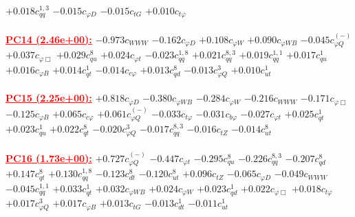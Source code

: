 \documentclass{article}
\begin{document}
{$+0.018$}{\rm $c_{qq}^{1,3}$} 
{$-0.015$}{\rm $c_{\varphi D}$} 
{$-0.015$}{\rm $c_{tG}$} 
{$+0.010$}{\rm $c_{t \varphi}$} 
 \nonumber \\ \nonumber \\ 
\noindent \textcolor{red}{\underline{\bf{PC14} (2.46e+00):}}
{$-0.973$}{\rm $c_{WWW}$} 
{$-0.162$}{\rm $c_{\varphi D}$} 
{$+0.108$}{\rm $c_{\varphi W}$} 
{$+0.090$}{\rm $c_{\varphi WB}$} 
{$-0.045$}{\rm $c_{\varphi Q}^{(-)}$} 
{$+0.037$}{\rm $c_{\varphi \Box}$} 
{$+0.029$}{\rm $c_{qu}^{8}$} 
{$+0.024$}{\rm $c_{\varphi t}$} 
{$-0.023$}{\rm $c_{qq}^{1,8}$} 
{$+0.021$}{\rm $c_{qq}^{8,3}$} 
{$+0.019$}{\rm $c_{qq}^{1,1}$} 
{$+0.017$}{\rm $c_{qu}^{1}$} 
{$+0.016$}{\rm $c_{\varphi B}$} 
{$+0.014$}{\rm $c_{qt}^{1}$} 
{$-0.014$}{\rm $c_{c \varphi}$} 
{$+0.013$}{\rm $c_{qd}^{8}$} 
{$-0.013$}{\rm $c_{\varphi Q}^{3}$} 
{$+0.010$}{\rm $c_{ut}^{1}$} 
 \nonumber \\ \nonumber \\ 
\noindent \textcolor{red}{\underline{\bf{PC15} (2.25e+00):}}
{$+0.818$}{\rm $c_{\varphi D}$} 
{$-0.380$}{\rm $c_{\varphi WB}$} 
{$-0.284$}{\rm $c_{\varphi W}$} 
{$-0.216$}{\rm $c_{WWW}$} 
{$-0.171$}{\rm $c_{\varphi \Box}$} 
{$-0.125$}{\rm $c_{\varphi B}$} 
{$+0.065$}{\rm $c_{c \varphi}$} 
{$+0.061$}{\rm $c_{\varphi Q}^{(-)}$} 
{$-0.033$}{\rm $c_{t \varphi}$} 
{$-0.031$}{\rm $c_{b \varphi}$} 
{$-0.027$}{\rm $c_{\varphi t}$} 
{$+0.025$}{\rm $c_{qt}^{1}$} 
{$+0.023$}{\rm $c_{qu}^{1}$} 
{$+0.022$}{\rm $c_{qt}^{8}$} 
{$-0.020$}{\rm $c_{\varphi Q}^{3}$} 
{$-0.017$}{\rm $c_{qq}^{8,3}$} 
{$-0.016$}{\rm $c_{tZ}$} 
{$-0.014$}{\rm $c_{ut}^{8}$} 
 \nonumber \\ \nonumber \\ 
\noindent \textcolor{red}{\underline{\bf{PC16} (1.73e+00):}}
{$+0.727$}{\rm $c_{\varphi Q}^{(-)}$} 
{$-0.447$}{\rm $c_{\varphi t}$} 
{$-0.295$}{\rm $c_{qu}^{8}$} 
{$-0.226$}{\rm $c_{qq}^{8,3}$} 
{$-0.207$}{\rm $c_{qd}^{8}$} 
{$+0.147$}{\rm $c_{qt}^{8}$} 
{$+0.130$}{\rm $c_{qq}^{1,8}$} 
{$-0.123$}{\rm $c_{dt}^{8}$} 
{$-0.120$}{\rm $c_{ut}^{8}$} 
{$+0.096$}{\rm $c_{tZ}$} 
{$-0.065$}{\rm $c_{\varphi D}$} 
{$-0.049$}{\rm $c_{WWW}$} 
{$-0.045$}{\rm $c_{qq}^{1,1}$} 
{$+0.033$}{\rm $c_{qt}^{1}$} 
{$+0.032$}{\rm $c_{\varphi WB}$} 
{$+0.024$}{\rm $c_{\varphi W}$} 
{$+0.023$}{\rm $c_{qd}^{1}$} 
{$+0.022$}{\rm $c_{\varphi \Box}$} 
{$+0.018$}{\rm $c_{t \varphi}$} 
{$+0.017$}{\rm $c_{\varphi Q}^{3}$} 
{$+0.017$}{\rm $c_{\varphi B}$} 
{$+0.013$}{\rm $c_{tG}$} 
{$-0.013$}{\rm $c_{dt}^{1}$} 
{$-0.011$}{\rm $c_{ut}^{1}$} 
 \nonumber \\ \nonumber \\ 
\end{document}
